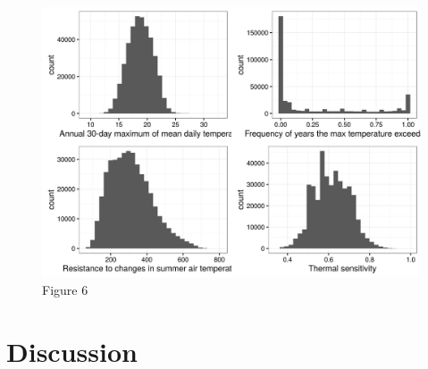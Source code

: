 \documentclass[]{article}
\begin{document}
\begin{figure}[htbp]
\centering
\includegraphics{Figures/metrics_histograms.jpg}
\caption{Figure 6}
\end{figure}

\section{Discussion}\label{discussion}
\end{document}

